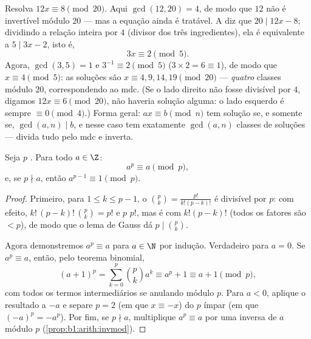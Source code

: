 \begin{example}\label{ex:b1:arith:noninvertible}
Resolva $12x \equiv 8 \pmod{20}$. Aqui $\gcd(12, 20) = 4$, de modo que $12$
não é invertível módulo $20$ --- mas a equação ainda é
tratável. A  diz que $20 \mid 12x - 8$; dividindo a
relação inteira por $4$ (divisor dos três ingredientes), ela é
equivalente a $5 \mid 3x - 2$, isto é,
\[
3x \equiv 2 \pmod 5 .
\]
Agora, $\gcd(3, 5) = 1$ e $3^{-1} \equiv 2 \pmod 5$ ($3 \times 2 =
6 \equiv 1$), de modo que $x \equiv 4 \pmod 5$: as soluções são $x
\equiv 4, 9, 14, 19 \pmod{20}$ --- \emph{quatro} classes módulo $20$,
correspondendo ao mdc. (Se o lado direito não fosse divisível por $4$,
digamos $12x \equiv 6 \pmod{20}$, não haveria solução alguma:
o lado esquerdo é sempre $\equiv 0 \pmod 4$.) Forma geral: $ax
\equiv b \pmod n$ tem solução se, e somente se, $\gcd(a, n) \mid b$, e nesse caso
tem exatamente $\gcd(a, n)$ classes de soluções --- divida tudo
pelo mdc e inverta.
\end{example}

\begin{theorem}\label{thm:b1:arith:fermat}
Seja $p$ . Para todo $a \in \Z$:
\[
a^p \equiv a \pmod p,
\]
e, se $p \nmid a$, então $a^{p-1} \equiv 1 \pmod
p$.
\end{theorem}

\begin{proof}
Primeiro, para $1 \leq k \leq p - 1$, o  $\binom pk
= \frac{p!}{k!(p-k)!}$ é divisível por $p$: com efeito, $k!\,(p-k)!\,
\binom pk = p!$ e $p$  $p!$, mas é  com $k!(p-k)!$
(todos os fatores são $< p$), de modo que o lema de Gauss dá $p \mid \binom pk$.

Agora demonstremos $a^p \equiv a$ para $a \in \N$ por indução. Verdadeiro para $a =
0$. Se $a^p \equiv a$, então, pelo teorema binomial,
\[
(a+1)^p = \sum_{k=0}^{p} \binom pk a^k
\equiv a^p + 1 \equiv a + 1 \pmod p,
\]
com todos os termos intermediários se anulando módulo $p$. Para $a < 0$,
aplique o resultado a $-a$ e separe $p = 2$ (em que $x \equiv -x$) do $p$ ímpar
(em que $(-a)^p = -a^p$). Por fim, se $p \nmid a$, multiplique $a^p \equiv a$ por
uma inversa de $a$ módulo $p$ (\cref{prop:b1:arith:invmod}).
\end{proof}

